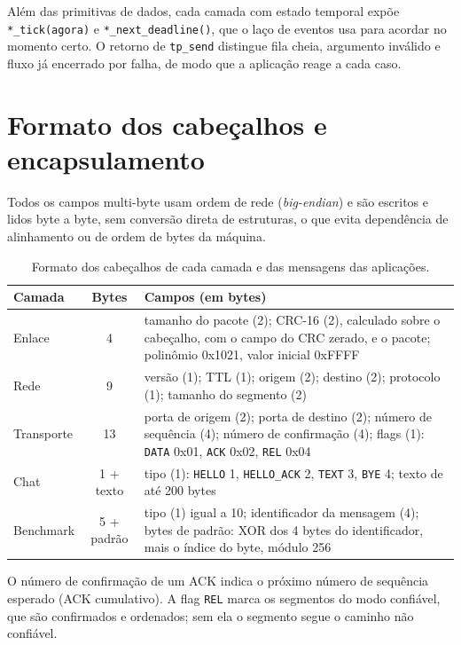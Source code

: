 \documentclass[11pt,a4paper]{article}
\begin{document}
Al\'em das primitivas de dados, cada camada com estado temporal exp\~oe \texttt{*\_tick(agora)} e \texttt{*\_next\_deadline()}, que o la\c{c}o de eventos usa para acordar no momento certo. O retorno de \texttt{tp\_send} distingue fila cheia, argumento inv\'alido e fluxo j\'a encerrado por falha, de modo que a aplica\c{c}\~ao reage a cada caso.

\section{Formato dos cabe\c{c}alhos e encapsulamento}

Todos os campos multi-byte usam ordem de rede (\emph{big-endian}) e s\~ao escritos e lidos byte a byte, sem convers\~ao direta de estruturas, o que evita depend\^encia de alinhamento ou de ordem de bytes da m\'aquina.

\begin{table}[H]
\centering\small
\begin{tabular}{lcL{9.2cm}}
\toprule
\textbf{Camada} & \textbf{Bytes} & \textbf{Campos (em bytes)} \\
\midrule
Enlace & 4 & tamanho do pacote (2); CRC-16 (2), calculado sobre o cabe\c{c}alho, com o campo do CRC zerado, e o pacote; polin\^omio 0x1021, valor inicial 0xFFFF \\
Rede & 9 & vers\~ao (1); TTL (1); origem (2); destino (2); protocolo (1); tamanho do segmento (2) \\
Transporte & 13 & porta de origem (2); porta de destino (2); n\'umero de sequ\^encia (4); n\'umero de confirma\c{c}\~ao (4); flags (1): \texttt{DATA} 0x01, \texttt{ACK} 0x02, \texttt{REL} 0x04 \\
Chat & 1 + texto & tipo (1): \texttt{HELLO} 1, \texttt{HELLO\_ACK} 2, \texttt{TEXT} 3, \texttt{BYE} 4; texto de at\'e 200 bytes \\
Benchmark & 5 + padr\~ao & tipo (1) igual a 10; identificador da mensagem (4); bytes de padr\~ao: XOR dos 4 bytes do identificador, mais o \'indice do byte, m\'odulo 256 \\
\bottomrule
\end{tabular}
\caption{Formato dos cabe\c{c}alhos de cada camada e das mensagens das aplica\c{c}\~oes.}
\end{table}

O n\'umero de confirma\c{c}\~ao de um ACK indica o pr\'oximo n\'umero de sequ\^encia esperado (ACK cumulativo). A flag \texttt{REL} marca os segmentos do modo confi\'avel, que s\~ao confirmados e ordenados; sem ela o segmento segue o caminho n\~ao confi\'avel.
\end{document}
